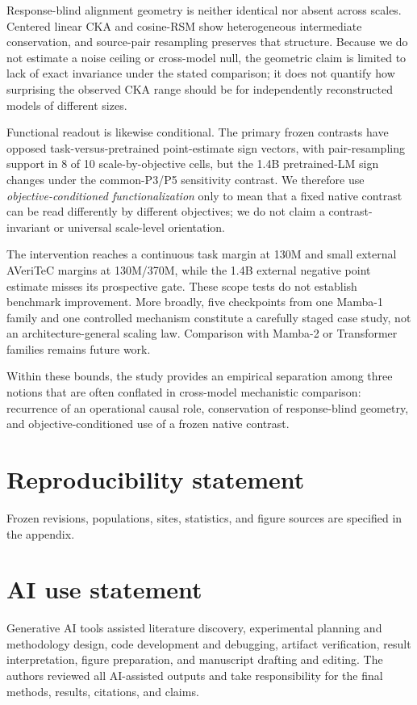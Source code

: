\documentclass{article}
\begin{document}
Response-blind alignment geometry is neither identical nor absent across scales. Centered linear CKA and cosine-RSM show heterogeneous intermediate conservation, and source-pair resampling preserves that structure. Because we do not estimate a noise ceiling or cross-model null, the geometric claim is limited to lack of exact invariance under the stated comparison; it does not quantify how surprising the observed CKA range should be for independently reconstructed models of different sizes.

Functional readout is likewise conditional. The primary frozen contrasts have opposed task-versus-pretrained point-estimate sign vectors, with pair-resampling support in 8 of 10 scale-by-objective cells, but the 1.4B pretrained-LM sign changes under the common-P3/P5 sensitivity contrast. We therefore use \emph{objective-conditioned functionalization} only to mean that a fixed native contrast can be read differently by different objectives; we do not claim a contrast-invariant or universal scale-level orientation.

The intervention reaches a continuous task margin at 130M and small external AVeriTeC margins at 130M/370M, while the 1.4B external negative point estimate misses its prospective gate. These scope tests do not establish benchmark improvement. More broadly, five checkpoints from one Mamba-1 family and one controlled mechanism constitute a carefully staged case study, not an architecture-general scaling law. Comparison with Mamba-2 or Transformer families remains future work.

Within these bounds, the study provides an empirical separation among three notions that are often conflated in cross-model mechanistic comparison: recurrence of an operational causal role, conservation of response-blind geometry, and objective-conditioned use of a frozen native contrast.

\label{paper:main-end}
\section*{Reproducibility statement}
Frozen revisions, populations, sites, statistics, and figure sources are specified in the appendix.
\section*{AI use statement}
Generative AI tools assisted literature discovery, experimental planning and methodology design, code development and debugging, artifact verification, result interpretation, figure preparation, and manuscript drafting and editing. The authors reviewed all AI-assisted outputs and take responsibility for the final methods, results, citations, and claims.
\label{paper:references-start}


\clearpage
\appendix

\end{document}
